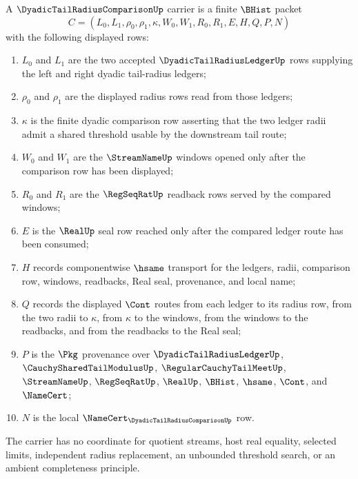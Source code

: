 \begin{definition}
\label{def:dyadic-tail-radius-comparison-carrier}
A $\DyadicTailRadiusComparisonUp$ carrier is a finite $\BHist$ packet
$$
C=(L_0,L_1,\rho_0,\rho_1,\kappa,W_0,W_1,R_0,R_1,E,H,Q,P,N)
$$
with the following displayed rows:
\begin{enumerate}
\item $L_0$ and $L_1$ are the two accepted $\DyadicTailRadiusLedgerUp$ rows supplying the left and right dyadic tail-radius ledgers;
\item $\rho_0$ and $\rho_1$ are the displayed radius rows read from those ledgers;
\item $\kappa$ is the finite dyadic comparison row asserting that the two ledger radii admit a shared threshold usable by the downstream tail route;
\item $W_0$ and $W_1$ are the $\StreamNameUp$ windows opened only after the comparison row has been displayed;
\item $R_0$ and $R_1$ are the $\RegSeqRatUp$ readback rows served by the compared windows;
\item $E$ is the $\RealUp$ seal row reached only after the compared ledger route has been consumed;
\item $H$ records componentwise $\hsame$ transport for the ledgers, radii, comparison row, windows, readbacks, Real seal, provenance, and local name;
\item $Q$ records the displayed $\Cont$ routes from each ledger to its radius row, from the two radii to $\kappa$, from $\kappa$ to the windows, from the windows to the readbacks, and from the readbacks to the Real seal;
\item $P$ is the $\Pkg$ provenance over $\DyadicTailRadiusLedgerUp$, $\CauchySharedTailModulusUp$, $\RegularCauchyTailMeetUp$, $\StreamNameUp$, $\RegSeqRatUp$, $\RealUp$, $\BHist$, $\hsame$, $\Cont$, and $\NameCert$;
\item $N$ is the local $\NameCert_{\DyadicTailRadiusComparisonUp}$ row.
\end{enumerate}
The carrier has no coordinate for quotient streams, host real equality, selected limits, independent radius replacement, an unbounded threshold search, or an ambient completeness principle.
\end{definition}

